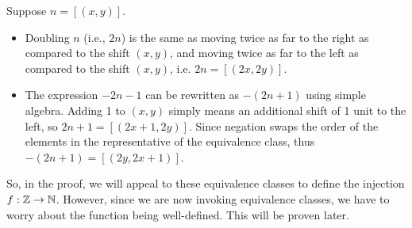 Suppose $n = [(x, y)]$.
\begin{itemize}
    \item Doubling $n$ (i.e., $2n$) is the same as moving twice as far to the right as compared to the shift $(x,y)$, and moving twice as far to the left as compared to the shift $(x,y)$, i.e. $2n = [(2x, 2y)]$.
    \item The expression $-2n - 1$ can be rewritten as $-(2n+1)$ using simple algebra. Adding 1 to $(x,y)$ simply means an additional shift of 1 unit to the left, so $2n + 1 = [(2x+1, 2y)]$. Since negation swaps the order of the elements in the representative of the equivalence class, thus $-(2n+1)= [(2y, 2x+1)]$.
\end{itemize}
So, in the proof, we will appeal to these equivalence classes to define the injection $f: \mathbb{Z} \to \mathbb{N}$. However, since we are now invoking equivalence classes, we have to worry about the function being well-defined. This will be proven later.

